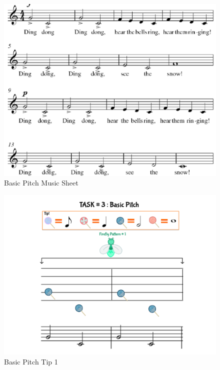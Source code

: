 \begin{figure}[H]
    \centering
    \includegraphics[width=12cm]{figures/NewFigures/BasicPitchMusicSheet.png}
    \caption{Basic Pitch Music Sheet}
    \label{fig:BasicPitchMusicSheet}
\end{figure}

\begin{figure}[H]
    \centering
    \includegraphics[width=12cm]{figures/NewFigures/BasicPitchTip1.png}
    \caption{Basic Pitch Tip 1}
    \label{fig:BasicPitchTip1}
\end{figure}

